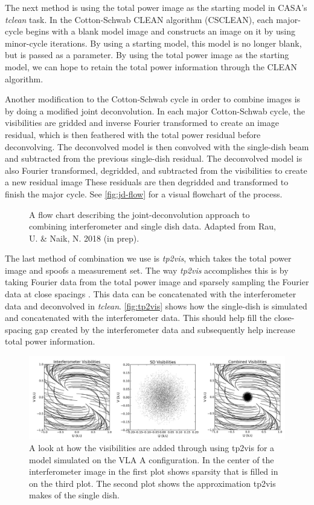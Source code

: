 \documentclass[manuscript,linenumbers]{aastex62}
\begin{document}
The next method is using the total power image as the starting model in CASA's \textit{tclean} task. In the Cotton-Schwab CLEAN algorithm (CSCLEAN), each major-cycle begins with a blank model image and constructs an image on it by using minor-cycle iterations. By using a starting model, this model is no longer blank, but is passed as a parameter. By using the total power image as the starting model, we can hope to retain the total power information through the CLEAN algorithm.

Another modification to the Cotton-Schwab cycle in order to combine images is by doing a modified joint deconvolution. In each major Cotton-Schwab cycle, the visibilities are gridded and inverse Fourier transformed to create an image residual, which is then feathered with the total power residual before deconvolving. The deconvolved model is then convolved with the single-dish beam and subtracted from the previous single-dish residual. The deconvolved model is also Fourier transformed, degridded, and subtracted from the visibilities to create a new residual image These residuals are then degridded and transformed to finish the major cycle. See \autoref{fig:jd-flow} for a visual flowchart of the process.

\begin{figure}[t]
    \caption{A flow chart describing the joint-deconvolution approach to combining interferometer and single dish data. Adapted from Rau, U. \& Naik, N. 2018 (in prep).}
    \label{fig:jd-flow}
\end{figure}

The last method of combination we use is \textit{tp2vis}, which takes the total power image and spoofs a measurement set. The way \textit{tp2vis} accomplishes this is by taking Fourier data from the total power image and sparsely sampling the Fourier data at close spacings \citep[see][]{2011ApJS..193...19K}. This data can be concatenated with the interferometer data and deconvolved in \textit{tclean}. \autoref{fig:tp2vis} shows how the single-dish is simulated and concatenated with the interferometer data. This should help fill the close-spacing gap created by the interferometer data and subsequently help increase total power information.

\begin{figure}[t]
    \includegraphics[width=\textwidth]{figures/tp2vis}
    \caption{A look at how the visibilities are added through using tp2vis for a model simulated on the VLA A configuration. In the center of the interferometer image in the first plot shows sparsity that is filled in on the third plot. The second plot shows the approximation tp2vis makes of the single dish.}
    \label{fig:tp2vis}
\end{figure}
\end{document}
